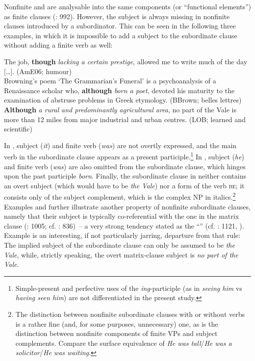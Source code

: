 Nonfinite and  are analysable into the same components (or “functional elements”) as finite clauses (\citealt{QuirkEtAl1985}: 992). However, the subject is always missing in nonfinite clauses introduced by a subordinator. This can be seen in the following three examples, in which it is impossible to add a subject to the subordinate clause without adding a finite verb as well:

\ea\label{ex:37}   \label{bkm:Ref489778084}The job, \textbf{though} \textit{lacking a certain prestige}, allowed me to write much of the day […]. (AmE06; humour)\\
    \ex\label{ex:38}\label{bkm:Ref489778311}Browning’s poem ‘The Grammarian’s Funeral’ is a psychoanalysis of a Renaissance scholar who, \textbf{although} \textit{born a poet}, devoted his maturity to the examination of abstruse problems in Greek etymology. (BBrown; belles lettres)\\
    \ex\label{ex:39}\label{bkm:Ref488843907}\textbf{Although} \textit{a rural and predominantly agricultural area}, no part of the Vale is more than 12 miles from major industrial and urban centres. (LOB; learned and scientific)\\
\z

In , subject (\textit{it}) and finite verb (\textit{was}) are not overtly expressed, and the main verb in the subordinate clause appears as a present participle.\footnote{Simple-present and perfective uses of the \textit{ing}-participle (as in \textit{seeing him} vs \textit{having seen him}) are not differentiated in the present study.} In , subject (\textit{he}) and finite verb (\textit{was}) are also omitted from the subordinate clause, which hinges upon the past participle \textit{born}.  Finally, the subordinate clause in  neither contains an overt subject (which would have to be \textit{the Vale}) nor a form of the verb \textsc{be}; it consists only of the subject complement, which is the complex NP in italics.\footnote{The distinction between nonfinite subordinate clauses with or without verbs is a rather fine (and, for some purposes, unnecessary) one, as is the distinction between nonfinite components of finite VPs and subject complements. Compare the surface equivalence of \textit{He was tall}\slash \textit{He was a solicitor}\slash \textit{He was waiting}.} Examples  and  further illustrate another property of nonfinite subordinate clauses, namely that their subject is typically co-referential with the one in the matrix clause (\citealt{QuirkEtAl1985}: 1005; cf. \citealt{Givón1990}: 836)~– a very strong tendency stated as the “” (cf. \citealt{QuirkEtAl1985}: 1121, \citealt{Schützler2018a}). Example  is an interesting, if not particularly jarring, departure from that rule: The implied subject of the subordinate clause can only be assumed to be \textit{the Vale}, while, strictly speaking, the overt matrix-clause subject is \textit{no part of the Vale}.

